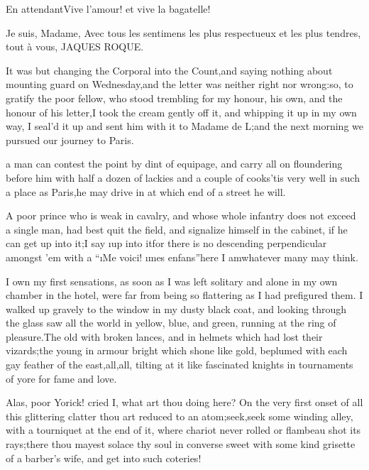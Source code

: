 \documentclass[twoside]{article}
\begin{document}
En attendant\tsk Vive l’amour! et vive la bagatelle!

                                                          Je suis, Madame,
                                          Avec tous les sentimens les plus
                                          respectueux et les plus tendres,
                                                              tout à vous,
                                                             JAQUES ROQUE.

It was but changing the Corporal into the Count,\tsk and saying nothing about
mounting guard on Wednesday,\tsk and the letter was neither right nor
wrong:\tsk so, to gratify the poor fellow, who stood trembling for my honour,
his own, and the honour of his letter,\tsk I took the cream gently off it,
and whipping it up in my own way, I seal’d it up and sent him with it to
Madame de L\tsk ;\tsk and the next morning we pursued our journey to Paris.






 a man can contest the point by dint of equipage, and carry all on
floundering before him with half a dozen of lackies and a couple of
cooks\tsk ’tis very well in such a place as Paris,\tsk he may drive in at which
end of a street he will.

A poor prince who is weak in cavalry, and whose whole infantry does not
exceed a single man, had best quit the field, and signalize himself in
the cabinet, if he can get up into it;\tsk I say \i{up into it}\tsk for there is no
descending perpendicular amongst ’em with a “\i{Me voici}! \i{mes
enfans}”\tsk here I am\tsk whatever many may think.

I own my first sensations, as soon as I was left solitary and alone in my
own chamber in the hotel, were far from being so flattering as I had
prefigured them.  I walked up gravely to the window in my dusty black
coat, and looking through the glass saw all the world in yellow, blue,
and green, running at the ring of pleasure.\tsk The old with broken lances,
and in helmets which had lost their vizards;\tsk the young in armour bright
which shone like gold, beplumed with each gay feather of the
east,\tsk all,\tsk all, tilting at it like fascinated knights in tournaments of
yore for fame and love.\tsk 

Alas, poor Yorick! cried I, what art thou doing here?  On the very first
onset of all this glittering clatter thou art reduced to an
atom;\tsk seek,\tsk seek some winding alley, with a tourniquet at the end of it,
where chariot never rolled or flambeau shot its rays;\tsk there thou mayest
solace thy soul in converse sweet with some kind grisette of a barber’s
wife, and get into such coteries!\tsk 
\end{document}

